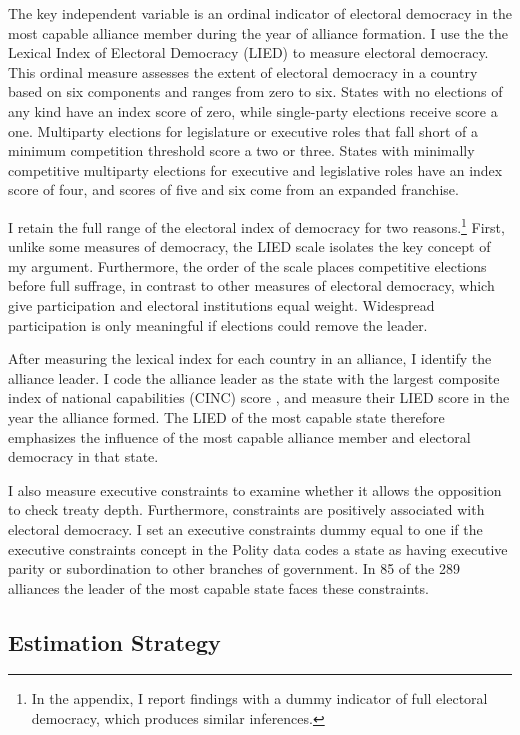 \documentclass[12pt]{article}
\begin{document}
The key independent variable is an ordinal indicator of electoral democracy in the most capable alliance member during the year of alliance formation. 
I use the the Lexical Index of Electoral Democracy (LIED) \citep{Skaaningetal2015} to measure electoral democracy.
This ordinal measure assesses the extent of electoral democracy in a country based on six components and ranges from zero to six.  
States with no elections of any kind have an index score of zero, while single-party elections receive score a one. 
Multiparty elections for legislature or executive roles that fall short of a minimum competition threshold score a two or three. 
States with minimally competitive multiparty elections for executive and legislative roles have an index score of four, and scores of five and six come from an expanded franchise.

I retain the full range of the electoral index of democracy for two reasons.\footnote{In the appendix, I report findings with a dummy indicator of full electoral democracy, which produces similar inferences.}
First, unlike some measures of democracy, the LIED scale isolates the key concept of my argument.
Furthermore, the order of the scale places competitive elections before full suffrage, in contrast to other measures of electoral democracy, which give participation and electoral institutions equal weight. 
Widespread participation is only meaningful if elections could remove the leader.


After measuring the lexical index for each country in an alliance, I identify the alliance leader.   
I code the alliance leader as the state with the largest composite index of national capabilities (CINC) score \citep{SingerCINC1988}, and measure their LIED score in the year the alliance formed.
The LIED of the most capable state therefore emphasizes the influence of the most capable alliance member and electoral democracy in that state.


I also measure executive constraints to examine whether it allows the opposition to check treaty depth. 
Furthermore, constraints are positively associated with electoral democracy.
I set an executive constraints dummy equal to one if the executive constraints concept in the Polity data codes a state as having executive parity or subordination to other branches of government.
In 85 of the 289 alliances the leader of the most capable state faces these constraints.



\subsection{Estimation Strategy}
\end{document}
